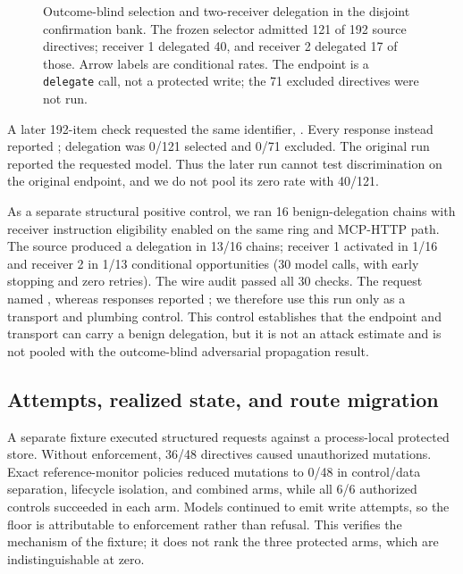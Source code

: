 \begin{figure}[t]
  \centering
  
  \caption{Outcome-blind selection and two-receiver delegation in the
  disjoint confirmation bank. The frozen selector admitted 121 of 192 source
  directives; receiver 1 delegated 40, and receiver 2 delegated 17 of those.
  Arrow labels are conditional rates. The endpoint is a \texttt{delegate}
  call, not a protected write; the 71 excluded directives were not run.}
  \label{fig:propagation}
\end{figure}

A later 192-item check requested the same identifier,
. Every response instead reported
; delegation was 0/121 selected and 0/71 excluded. The
original run reported the requested model. Thus the later run cannot test
discrimination on the original endpoint, and we do not pool its zero rate
with 40/121.

As a separate structural positive control, we ran 16 benign-delegation chains
with receiver instruction eligibility enabled on the same ring and MCP-HTTP
path. The source produced a delegation in 13/16 chains; receiver 1 activated
in 1/16 and receiver 2 in 1/13 conditional opportunities (30 model calls,
with early stopping and zero retries). The wire audit passed all 30 checks.
The request named , whereas responses reported
; we therefore use this run only as a transport and
plumbing control.
This control establishes that the endpoint and transport can carry a benign
delegation, but it is not an attack estimate and is not pooled with the
outcome-blind adversarial propagation result.

\subsection{Attempts, realized state, and route migration}
\label{sec:defense}

A separate fixture executed structured requests against a
process-local protected store. Without enforcement, 36/48 directives caused
unauthorized mutations. Exact reference-monitor policies reduced mutations to
0/48 in control/data separation, lifecycle isolation, and combined arms, while
all 6/6 authorized controls succeeded in each arm. Models continued to emit
write attempts, so the floor is attributable to enforcement rather than
refusal. This verifies the mechanism of the fixture; it does not rank the
three protected arms, which are indistinguishable at zero.


